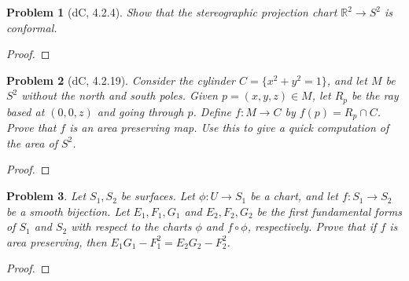 \documentclass[11pt]{article}
\newtheorem{problem}{Problem}
\begin{document}
\begin{problem}[dC, 4.2.4]
Show that the stereographic projection chart $\mathbb R^2\to S^2$ is conformal. 
\end{problem}

\begin{proof}

\end{proof}

\pagebreak 

\begin{problem}[dC, 4.2.19]
Consider the cylinder $C=\{x^2+y^2=1\}$, and let $M$ be $S^2$ without the north and south poles. Given $p=(x,y,z)\in M$, let $R_p$ be the ray based at $(0,0,z)$ and going through $p$. Define $f:M\to C$ by $f(p)=R_p\cap C$. Prove that $f$ is an area preserving map. Use this to give a quick computation of the area of $S^2$. 
\end{problem}

\begin{proof}

\end{proof}

\pagebreak 

\begin{problem}
Let $S_1,S_2$ be surfaces. Let $\phi:U\to S_1$ be a chart, and let $f:S_1\to S_2$ be a smooth bijection. Let $E_1,F_1,G_1$ and $E_2,F_2,G_2$ be the first fundamental forms of $S_1$ and $S_2$ with respect to the charts $\phi$ and $f\circ\phi$, respectively. Prove that if $f$ is area preserving, then $E_1G_1-F_1^2=E_2G_2-F_2^2$. 
\end{problem}

\begin{proof}

\end{proof}
\end{document}
